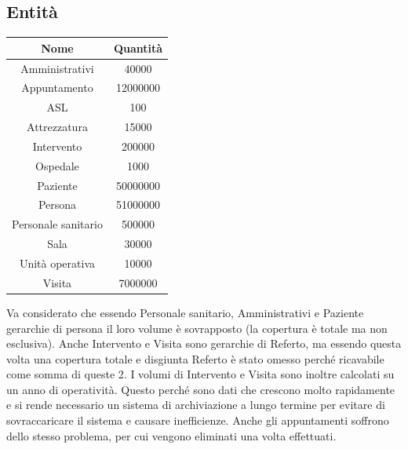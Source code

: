 \documentclass[a4paper,12pt]{report}
\begin{document}
\subsection{Entità}
\begin{center}
  \begin{tabular}{ c | S[table-format=8.0, table-space-text-pre=(, table-space-text-post=)] }
    Nome & Quantità \\
    \hline
    Amministrativi & 40000 \\
    Appuntamento & 12000000 \\
    ASL & 100 \\
    Attrezzatura & 15000 \\
    Intervento & 200000 \\
    Ospedale & 1000 \\
    Paziente & 50000000 \\
    Persona & 51000000 \\
    Personale sanitario & 500000 \\
    Sala & 30000 \\
    Unità operativa & 10000\\
    Visita & 7000000 \\
  \end{tabular}
\end{center}
 
Va considerato che essendo Personale sanitario, Amministrativi e Paziente gerarchie di persona il loro volume è 
sovrapposto (la copertura è totale ma non esclusiva). 
Anche Intervento e Visita sono gerarchie di Referto, ma essendo questa volta una copertura totale e disgiunta Referto
è stato omesso perché ricavabile come somma di queste 2.
I volumi di Intervento e Visita sono inoltre calcolati su un anno di operatività. Questo perché sono dati che crescono molto rapidamente 
e si rende necessario un sistema di archiviazione a lungo termine per evitare di sovraccaricare il sistema e causare inefficienze.
Anche gli appuntamenti soffrono dello stesso problema, per cui vengono eliminati una volta effettuati.
\end{document}
